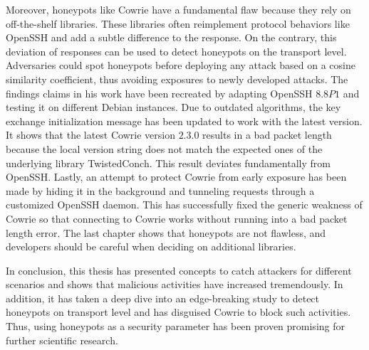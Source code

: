 Moreover, honeypots like Cowrie have a fundamental flaw because they rely on off-the-shelf libraries.
These libraries often reimplement protocol behaviors like OpenSSH and add a subtle difference to the response.
On the contrary, this deviation of responses can be used to detect honeypots on the transport level.
Adversaries could spot honeypots before deploying any attack based on a cosine similarity coefficient, thus avoiding exposures to newly developed attacks.
The findings \citet{vetterl2020} claims in his work have been recreated by adapting OpenSSH $8.8P1$ and testing it on different Debian instances.
Due to outdated algorithms, the key exchange initialization message has been updated to work with the latest version.
It shows that the latest Cowrie version $2.3.0$ results in a bad packet length because the local version string does not match the expected ones of the underlying library TwistedConch.
This result deviates fundamentally from OpenSSH.
Lastly, an attempt to protect Cowrie from early exposure has been made by hiding it in the background and tunneling requests through a customized OpenSSH daemon.
This has successfully fixed the generic weakness of Cowrie so that connecting to Cowrie works without running into a bad packet length error.
The last chapter shows that honeypots are not flawless, and developers should be careful when deciding on additional libraries.

In conclusion, this thesis has presented concepts to catch attackers for different scenarios and shows that malicious activities have increased tremendously.
In addition, it has taken a deep dive into an edge-breaking study to detect honeypots on transport level and has disguised Cowrie to block such activities.
Thus, using honeypots as a security parameter has been proven promising for further scientific research.
